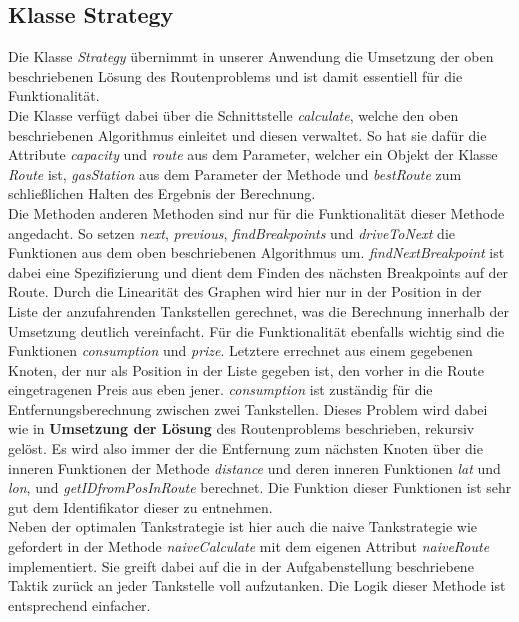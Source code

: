 \documentclass[11pt]{article}
\begin{document}
\subsection{Klasse Strategy}
	Die Klasse \textit{Strategy} übernimmt in unserer Anwendung die Umsetzung der oben beschriebenen Lösung des Routenproblems und ist damit essentiell für die Funktionalität. \\
	Die Klasse verfügt dabei über die Schnittstelle \textit{calculate}, welche den oben beschriebenen Algorithmus einleitet und diesen verwaltet. So hat sie dafür die Attribute \textit{capacity} und \textit{route} aus dem Parameter, welcher ein Objekt der Klasse \textit{Route} ist, \textit{gasStation} aus dem Parameter der Methode und \textit{bestRoute} zum schließlichen Halten des Ergebnis der Berechnung. \\
	Die Methoden anderen Methoden sind nur für die Funktionalität dieser Methode angedacht. So setzen \textit{next}, \textit{previous}, \textit{findBreakpoints} und \textit{driveToNext} die Funktionen aus dem oben beschriebenen Algorithmus um. \textit{findNextBreakpoint} ist dabei eine Spezifizierung und dient dem Finden des nächsten Breakpoints auf der Route. Durch die Linearität des Graphen wird hier nur in der Position in der Liste der anzufahrenden Tankstellen gerechnet, was die Berechnung innerhalb der Umsetzung deutlich vereinfacht. Für die Funktionalität ebenfalls wichtig sind die Funktionen \textit{consumption} und \textit{prize}. Letztere errechnet aus einem gegebenen Knoten, der nur als Position in der Liste gegeben ist, den vorher in die Route eingetragenen Preis aus eben jener. \textit{consumption} ist zuständig für die Entfernungsberechnung zwischen zwei Tankstellen. Dieses Problem wird dabei wie in \textbf{Umsetzung der Lösung} des Routenproblems beschrieben, rekursiv gelöst. Es wird also immer der die Entfernung zum nächsten Knoten über die inneren Funktionen der Methode \textit{distance} und deren inneren Funktionen \textit{lat} und \textit{lon}, und \textit{getIDfromPosInRoute} berechnet. Die Funktion dieser Funktionen ist sehr gut dem Identifikator dieser zu entnehmen. \\
	Neben der optimalen Tankstrategie ist hier auch die \glqq naive\grqq{} Tankstrategie wie gefordert in der Methode \textit{naiveCalculate} mit dem eigenen Attribut \textit{naiveRoute} implementiert. Sie greift dabei auf die in der Aufgabenstellung beschriebene Taktik zurück an jeder Tankstelle voll aufzutanken. Die Logik dieser Methode ist entsprechend einfacher. 
\end{document}
